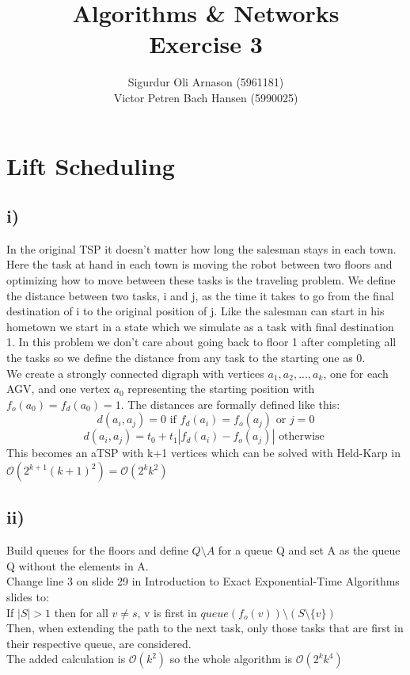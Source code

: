 \documentclass[a4paper]{article}
\author{Sigurdur Oli Arnason (5961181) \\ Victor Petren Bach Hansen (5990025)}
\title{Algorithms \& Networks \\ Exercise 3}
\begin{document}
\maketitle
\section{Lift Scheduling}

\subsection*{i)}
In the original TSP it doesn't matter how long the salesman stays in each town. Here the task at hand in each town is moving the robot between two floors and optimizing how to move between these tasks is the traveling problem. We define the distance between two tasks, i and j, as the time it takes to go from the final destination of i to the original position of j. Like the salesman can start in his hometown we start in a state which we simulate as a task with final destination 1. In this problem we don't care about going back to floor 1 after completing all the tasks so we define the distance from any task to the starting one as 0. \\
We create a strongly connected digraph with vertices $a_1, a_2, ..., a_k$, one for each AGV, and one vertex $a_0$ representing the starting position with $f_o(a_0) = f_d(a_0) = 1$. The distances are formally defined like this: \\
\[
d(a_i, a_j) = 0 \textrm{ if } f_d(a_i) = f_o(a_j) \textrm{ or } j = 0
\]
\[
d(a_i, a_j) = t_0 + t_1|f_d(a_i) - f_o(a_j)| \textrm{ otherwise }
\]
This becomes an aTSP with k+1 vertices which can be solved with Held-Karp in $\mathcal{O}(2^{k+1}(k+1)^2)=\mathcal{O}(2^{k}k^2)$

\subsection*{ii)}
Build queues for the floors and define $Q\setminus A$ for a queue Q and set A as the queue Q without the elements in A. \\
Change line 3 on slide 29 in Introduction to Exact Exponential-Time Algorithms slides to:\\
If $|S|>1$ then for all $v \neq s$, v is first in $queue(f_o(v))\setminus(S \setminus \{v\})$ \\
Then, when extending the path to the next task, only those tasks that are first in their respective queue, are considered. \\
The added calculation is $\mathcal{O}(k^2)$ so the whole algorithm is $\mathcal{O}(2^{k}k^4)$
\end{document}
